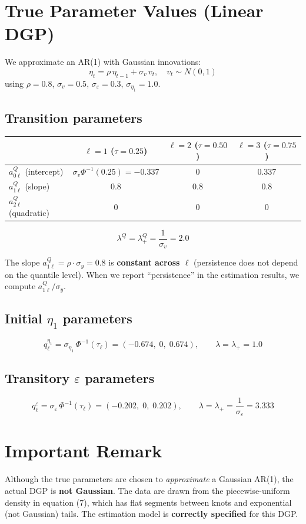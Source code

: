 \documentclass[12pt]{article}
\begin{document}
\section{True Parameter Values (Linear DGP)}

We approximate an AR(1) with Gaussian innovations:
\[
\eta_t = \rho\,\eta_{t-1} + \sigma_v\, v_t, \quad v_t \sim N(0,1)
\]
using $\rho = 0.8$, $\sigma_v = 0.5$, $\sigma_\varepsilon = 0.3$, $\sigma_{\eta_1} = 1.0$.

\subsection{Transition parameters}

\begin{center}
\begin{tabular}{l|ccc}
& $\ell=1$ ($\tau=0.25$) & $\ell=2$ ($\tau=0.50$) & $\ell=3$ ($\tau=0.75$) \\
\hline
$a_{0\ell}^Q$ (intercept) & $\sigma_v \Phi^{-1}(0.25) = -0.337$ & $0$ & $0.337$ \\
$a_{1\ell}^Q$ (slope) & $0.8$ & $0.8$ & $0.8$ \\
$a_{2\ell}^Q$ (quadratic) & $0$ & $0$ & $0$
\end{tabular}
\end{center}
\[
\lambda^Q = \lambda_+^Q = \frac{1}{\sigma_v} = 2.0
\]

The slope $a_{1\ell}^Q = \rho \cdot \sigma_y = 0.8$ is \textbf{constant across $\ell$} (persistence does not depend on the quantile level). When we report ``persistence'' in the estimation results, we compute $a_{1\ell}^Q / \sigma_y$.

\subsection{Initial $\eta_1$ parameters}

\[
q_\ell^{\eta_1} = \sigma_{\eta_1}\, \Phi^{-1}(\tau_\ell) = (-0.674,\; 0,\; 0.674), \qquad \lambda = \lambda_+ = 1.0
\]

\subsection{Transitory $\varepsilon$ parameters}

\[
q_\ell^\varepsilon = \sigma_\varepsilon\, \Phi^{-1}(\tau_\ell) = (-0.202,\; 0,\; 0.202), \qquad \lambda = \lambda_+ = \frac{1}{\sigma_\varepsilon} = 3.333
\]

\section{Important Remark}

Although the true parameters are chosen to \emph{approximate} a Gaussian AR(1), the actual DGP is \textbf{not Gaussian}. The data are drawn from the piecewise-uniform density in equation (7), which has flat segments between knots and exponential (not Gaussian) tails. The estimation model is \textbf{correctly specified} for this DGP.
\end{document}
